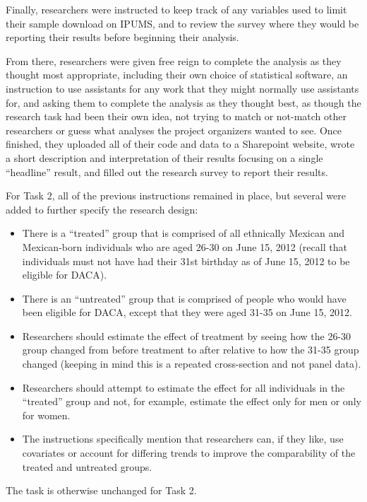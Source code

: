 \documentclass[
  letterpaper,
  DIV=11,
  numbers=noendperiod]{scrartcl}
\begin{document}
Finally, researchers were instructed to keep track of any variables used
to limit their sample download on IPUMS, and to review the survey where
they would be reporting their results before beginning their analysis.

From there, researchers were given free reign to complete the analysis
as they thought most appropriate, including their own choice of
statistical software, an instruction to use assistants for any work that
they might normally use assistants for, and asking them to complete the
analysis as they thought best, as though the research task had been
their own idea, not trying to match or not-match other researchers or
guess what analyses the project organizers wanted to see. Once finished,
they uploaded all of their code and data to a Sharepoint website, wrote
a short description and interpretation of their results focusing on a
single ``headline'' result, and filled out the research survey to report
their results.

For Task 2, all of the previous instructions remained in place, but
several were added to further specify the research design:

\begin{itemize}
\item
  There is a ``treated'' group that is comprised of all ethnically
  Mexican and Mexican-born individuals who are aged 26-30 on June 15,
  2012 (recall that individuals must not have had their 31st birthday as
  of June 15, 2012 to be eligible for DACA).
\item
  There is an ``untreated'' group that is comprised of people who would
  have been eligible for DACA, except that they were aged 31-35 on June
  15, 2012.
\item
  Researchers should estimate the effect of treatment by seeing how the
  26-30 group changed from before treatment to after relative to how the
  31-35 group changed (keeping in mind this is a repeated cross-section
  and not panel data).
\item
  Researchers should attempt to estimate the effect for all individuals
  in the ``treated'' group and not, for example, estimate the effect
  only for men or only for women.
\item
  The instructions specifically mention that researchers can, if they
  like, use covariates or account for differing trends to improve the
  comparability of the treated and untreated groups.
\end{itemize}

The task is otherwise unchanged for Task 2.
\end{document}
